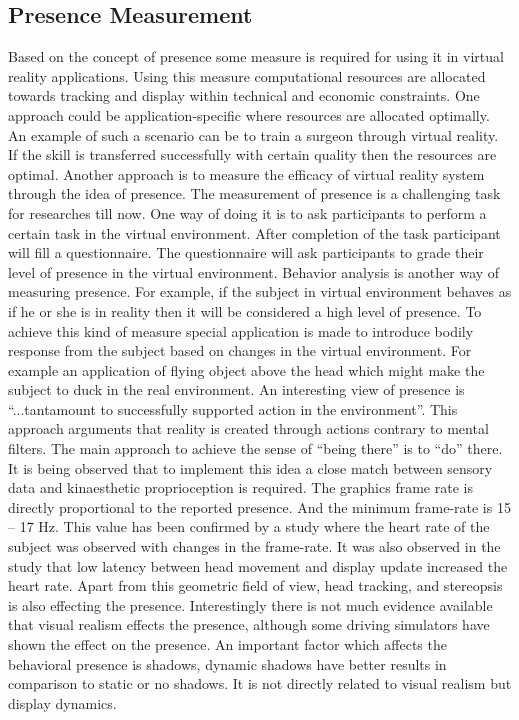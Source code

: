 \subsection{Presence Measurement}
Based on the concept of presence some measure is required for using it in virtual reality applications. Using this measure computational resources are allocated towards tracking and display within technical and economic constraints. One approach could be application-specific where resources are allocated optimally. An example of such a scenario can be to train a surgeon through virtual reality. If the skill is transferred successfully with certain quality then the resources are optimal. Another approach is to measure the efficacy of virtual reality system through the idea of presence. The measurement of presence is a challenging task for researches till now. One way of doing it is to ask participants to perform a certain task in the virtual environment. After completion of the task participant will fill a questionnaire. The questionnaire will ask participants to grade their level of presence in the virtual environment. Behavior analysis is another way of measuring presence. For example, if the subject in virtual environment behaves as if he or she is in reality then it will be considered a high level of presence. To achieve this kind of measure special application is made to introduce bodily response from the subject based on changes in the virtual environment. For example an application of flying object above the head which might make the subject to duck in the real environment. An interesting view of presence is “...tantamount to successfully supported action in the environment”\cite{youngblut2003experience}. This approach arguments that reality is created through actions contrary to mental filters. The main approach to achieve the sense of “being there” is to “do” there. It is being observed that to implement this idea a close match between sensory data and kinaesthetic proprioception is required. The graphics frame rate is directly proportional to the reported presence. And the minimum frame-rate is 15 – 17 Hz. This value has been confirmed by a study \cite{deniaud2015investigation} where the heart rate of the subject was observed with changes in the frame-rate. It was also observed in the study that low latency between head movement and display update increased the heart rate. Apart from this geometric field of view, head tracking, and stereopsis is also effecting the presence. Interestingly there is not much evidence available that visual realism effects the presence, although some driving simulators have shown the effect on the presence. An important factor which affects the behavioral presence is shadows, dynamic shadows have better results in comparison to static or no shadows. It is not directly related to visual realism but display dynamics\cite{youngblut2003experience}.
\let\cleardoublepage\clearpage
